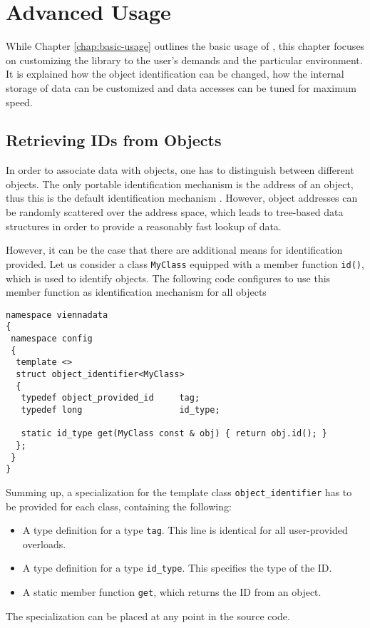 \chapter{Advanced Usage} \label{chap:advanced-usage}


While Chapter \ref{chap:basic-usage} outlines the basic usage of {\ViennaData}, this chapter focuses
on customizing the library to the user's demands and the particular environment. It is explained how
the object identification can be changed, how the internal storage of data can be customized and data
accesses can be tuned for maximum speed.

\section{Retrieving IDs from Objects} \label{sec:id-retrieval}
In order to associate data with objects, one has to distinguish between different objects. The only portable identification mechanism
is the address of an object, thus this is the default identification mechanism {\ViennaData}.
However, object addresses can be randomly scattered over the address space, which leads to tree-based data structures in order to
provide a reasonably fast lookup of data.

However, it can be the case that there are additional means for identification provided.
Let us consider a class \lstinline|MyClass| equipped with a member function \lstinline|id()|, which
is used to identify objects. The following code configures {\ViennaData} to use this member function
as identification mechanism for all objects
\begin{lstlisting}
namespace viennadata
{
 namespace config
 {
  template <>
  struct object_identifier<MyClass>
  {
   typedef object_provided_id     tag;
   typedef long                   id_type;

   static id_type get(MyClass const & obj) { return obj.id(); }
  };
 }
}
\end{lstlisting}
Summing up, a specialization for the template class \lstinline|object_identifier| has to be provided
for each class, containing the following:
\begin{itemize}
 \item A type definition for a type \lstinline|tag|. This line is identical for all user-provided overloads.
 \item A type definition for a type \lstinline|id_type|. This specifies the type of the ID.
 \item A static member function \lstinline|get|, which returns the ID from an object.
\end{itemize}
The specialization can be placed at any point in the source code.

